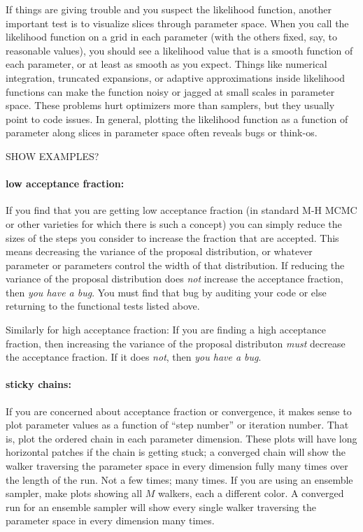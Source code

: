 \documentclass[12pt,twoside,pdftex]{article}
\begin{document}
If things are giving trouble and you suspect the likelihood function,
  another important test is to visualize slices through parameter space.
When you call the likelihood function on a grid in each parameter
  (with the others fixed, say, to reasonable values),
  you should see a likelihood value that is a smooth function of each parameter,
  or at least as smooth as you expect.
Things like numerical integration,
  truncated expansions,
  or adaptive approximations
  inside likelihood functions
  can make the function noisy or jagged at small scales in parameter space.
These problems hurt optimizers more than samplers,
  but they usually point to code issues.
In general, plotting the likelihood function as a function of parameter along
  slices in parameter space often reveals bugs or think-os.

SHOW EXAMPLES?

\paragraph{low acceptance fraction:}
If you find that you are getting low acceptance fraction
  (in standard M-H MCMC or other varieties for which there is such a concept)
  you can simply reduce the sizes of the steps you consider to increase the fraction that are accepted.
This means decreasing the variance of the proposal distribution,
  or whatever parameter or parameters control the width of that distribution.
If reducing the variance of the proposal distribution does \emph{not} increase the acceptance fraction,
  then \emph{you have a bug}.
You must find that bug by auditing your code or else returning to the functional tests listed above.

Similarly for high acceptance fraction:
If you are finding a high acceptance fraction,
  then increasing the variance of the proposal distributon \emph{must} decrease the acceptance fraction.
If it does \emph{not}, then \emph{you have a bug}.

\paragraph{sticky chains:}
If you are concerned about acceptance fraction or convergence,
  it makes sense to plot parameter values as a function of ``step number'' or iteration number.
That is, plot the ordered chain in each parameter dimension.
These plots will have long horizontal patches if the chain is getting stuck;
  a converged chain will show the walker traversing the parameter space in every dimension fully many times
  over the length of the run.
Not a few times; many times.
If you are using an ensemble sampler,
  make plots showing all $M$ walkers, each a different color.
A converged run for an ensemble sampler will show every single walker traversing the parameter space
  in every dimension many times.
\end{document}
